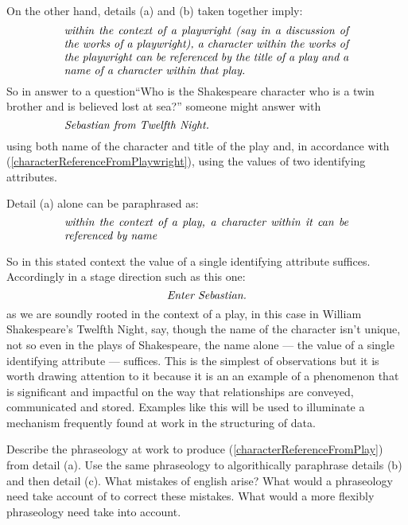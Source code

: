 \mynote %
On the other hand, details (a) and (b) taken together imply: 
\begin{equation}
\label{characterReferenceFromPlaywright}
\text{\parbox{9cm}{\textit{within the context of a playwright
(say in a discussion of the works of a playwright), 
a character within the works of the playwright 
can be referenced by the title of a play 
and a name of a character within that play. }}}\\
\end{equation}
So in answer to a question``Who is the Shakespeare character who is a twin brother and is believed lost at sea?''
someone might answer with 
\begin{equation*}
\label{antonioReferenceFromPlaywright}
\text{\parbox{9cm}{\textit{Sebastian from Twelfth Night. }}}\\
\end{equation*}
using both name of the character and title of the play and, 
in accordance with (\ref{characterReferenceFromPlaywright}),
using the values of two identifying attributes.

\mynote %
Detail (a) alone can be paraphrased as: 
\begin{equation}
\label{characterReferenceFromPlay}
\text{\parbox{9cm}{\textit{within the context of a play, a character within it can be referenced by name}}}\\
\end{equation}

So in this stated context the value of a single identifying attribute suffices. 
Accordingly in a stage direction such as this one:  
\begin{equation*}
\text{\textit{Enter Sebastian.}}
\end{equation*}
as we are soundly rooted in the context of a play, in this case in William Shakespeare's Twelfth Night, say,
though the name of the character isn't unique, not so even in the plays of Shakespeare, the name alone
 --- the value of a single identifying attribute --- suffices.
This is the simplest of observations
but it is worth drawing attention to it  
because it is an an example of a phenomenon  that is significant
and impactful on the way that 
relationships are conveyed, communicated and stored.
Examples like this will be used to illuminate a  mechanism frequently found at work in the
structuring of data.

\begin{exerciseforreader}
Describe the phraseology 
at work to produce  (\ref{characterReferenceFromPlay}) from detail (a). 
Use the same phraseology to algorithically paraphrase details (b) and then detail (c).
What mistakes of english arise?
What would a phraseology need take account of to correct these mistakes.
What would a more flexibly phraseology need take into account.
\end{exerciseforreader}
